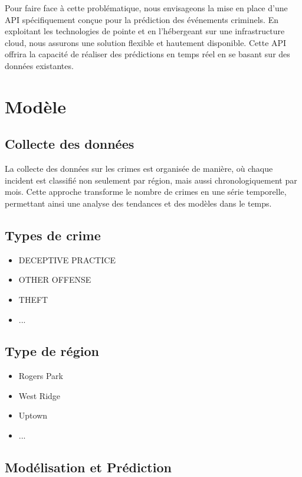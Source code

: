 \documentclass[12pt]{article}
\begin{document}
Pour faire face à cette problématique, nous envisageons la mise en place d'une API spécifiquement 
conçue pour la prédiction des événements criminels. En exploitant les technologies de pointe et en l'hébergeant sur une infrastructure cloud, nous assurons une solution flexible et hautement disponible. Cette API offrira la capacité de réaliser des prédictions en temps réel en se basant sur des données existantes.

\section{Modèle}

\subsection{Collecte des données}

La collecte des données sur les crimes est organisée de manière, où chaque incident est classifié non seulement par région, mais aussi chronologiquement par mois. Cette approche transforme le nombre de crimes en une série temporelle, permettant ainsi une analyse des tendances et des modèles dans le temps.

\subsection{Types de crime}

\begin{itemize}
    \item DECEPTIVE PRACTICE
    \item OTHER OFFENSE
    \item THEFT
    \item ...
\end{itemize}

\subsection{Type de région}

\begin{itemize}
    \item Rogers Park
    \item West Ridge
    \item Uptown
    \item ...
\end{itemize}

\subsection{Modélisation et Prédiction}
\end{document}

